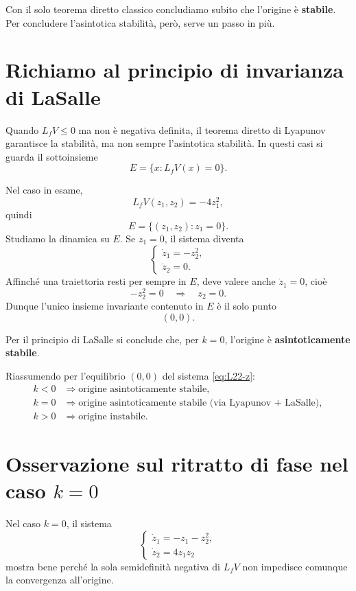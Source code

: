 Con il solo teorema diretto classico concludiamo subito che l'origine è \textbf{stabile}.  
Per concludere l'asintotica stabilità, però, serve un passo in più.

\section{Richiamo al principio di invarianza di LaSalle}

Quando \(L_fV\le 0\) ma non è negativa definita, il teorema diretto di Lyapunov garantisce la stabilità, ma non sempre l'asintotica stabilità. In questi casi si guarda il sottoinsieme
\[
E=\{x : L_fV(x)=0\}.
\]

Nel caso in esame,
\[
L_fV(z_1,z_2)=-4z_1^2,
\]
quindi
\[
E=\{(z_1,z_2): z_1=0\}.
\]
Studiamo la dinamica su \(E\). Se \(z_1=0\), il sistema diventa
\[
\begin{cases}
\dot z_1=-z_2^2,\\
\dot z_2=0.
\end{cases}
\]
Affinché una traiettoria resti per sempre in \(E\), deve valere anche \(\dot z_1=0\), cioè
\[
-z_2^2=0 \quad \Longrightarrow \quad z_2=0.
\]
Dunque l'unico insieme invariante contenuto in \(E\) è il solo punto
\[
(0,0).
\]

Per il principio di LaSalle si conclude che, per \(k=0\), l'origine è \textbf{asintoticamente stabile}.

\medskip

\noindent
Riassumendo per l'equilibrio \((0,0)\) del sistema \eqref{eq:L22-z}:
\[
\boxed{
\begin{array}{ll}
k<0 & \Rightarrow \text{origine asintoticamente stabile},\\[4pt]
k=0 & \Rightarrow \text{origine asintoticamente stabile (via Lyapunov + LaSalle)},\\[4pt]
k>0 & \Rightarrow \text{origine instabile}.
\end{array}
}
\]

\section{Osservazione sul ritratto di fase nel caso \(k=0\)}

Nel caso \(k=0\), il sistema
\[
\begin{cases}
\dot z_1=-z_1-z_2^2,\\
\dot z_2=4z_1z_2
\end{cases}
\]
mostra bene perché la sola semidefinità negativa di \(L_fV\) non impedisce comunque la convergenza all'origine.

